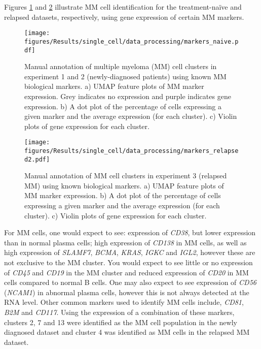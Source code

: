 Figures \ref{fig:mm_markers_naive} and \ref{fig:mm_markers_relapsed} illustrate MM cell identification for the treatment-na\"ive and relapsed datasets, respectively, using gene expression of certain MM markers.
\begin{figure}[p]
    \centering
    \texttt{[image: figures/Results/single\_cell/data\_processing/markers\_naive.pdf]}
    \caption[MM cluster identification- newly diagnosed MM]{Manual annotation of multiple myeloma (MM) cell clusters in experiment 1 and 2 (newly-diagnosed patients) using known MM biological markers.
    a) UMAP feature plots of MM marker expression.
    Grey indicates no expression and purple indicates gene expression.
    b) A dot plot of the percentage of cells expressing a given marker and the average expression (for each cluster).
    c) Violin plots of gene expression for each cluster.}
    \label{fig:mm_markers_naive}
\end{figure}
%
\begin{figure}[p]
    \centering
    \texttt{[image: figures/Results/single\_cell/data\_processing/markers\_relapsed2.pdf]}
    \caption[MM cluster identification- relapsed MM]{Manual annotation of MM cell clusters in experiment 3 (relapsed MM) using known biological markers.
    a) UMAP feature plots of MM marker expression.
    b) A dot plot of the percentage of cells expressing a given marker and the average expression (for each cluster).
    c) Violin plots of gene expression for each cluster. }
    \label{fig:mm_markers_relapsed}
\end{figure}
%
For MM cells, one would expect to see: expression of \textit{CD38}, but lower expression than in normal plasma cells;
high expression of \textit{CD138} in MM cells, as well as high expression of \textit{SLAMF7}, \textit{BCMA}, \textit{KRAS}, \textit{IGKC} and \textit{IGL2}, however these are not exclusive to the MM cluster.
You would expect to see little or no expression of \textit{CD45} and \textit{CD19} in the MM cluster and reduced expression of \textit{CD20} in MM cells compared to normal B cells.
One may also expect to see expression of \textit{CD56} (\textit{NCAM1}) in abnormal plasma cells, however this is not always detected at the RNA level.
Other common markers used to identify MM cells include, \textit{CD81}, \textit{B2M} and \textit{CD117}.
Using the expression of a combination of these markers, clusters 2, 7 and 13 were identified as the MM cell population in the newly diagnosed dataset and cluster 4 was identified as MM cells in the relapsed MM dataset.

